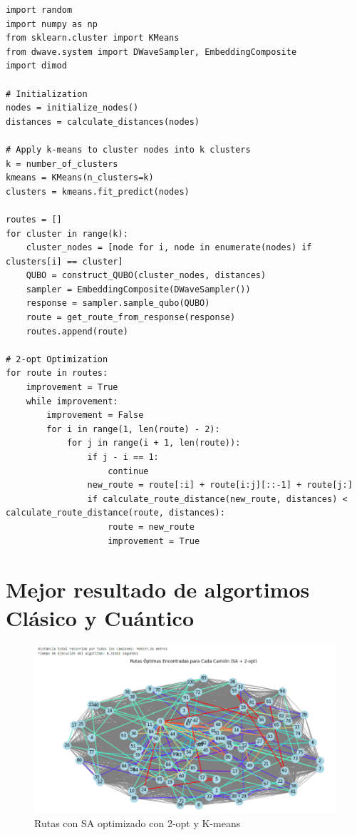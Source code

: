 \documentclass[11pt,a4paper,spanish]{book}
\begin{document}
\begin{lstlisting}
import random
import numpy as np
from sklearn.cluster import KMeans
from dwave.system import DWaveSampler, EmbeddingComposite
import dimod

# Initialization
nodes = initialize_nodes()
distances = calculate_distances(nodes)

# Apply k-means to cluster nodes into k clusters
k = number_of_clusters
kmeans = KMeans(n_clusters=k)
clusters = kmeans.fit_predict(nodes)

routes = []
for cluster in range(k):
    cluster_nodes = [node for i, node in enumerate(nodes) if clusters[i] == cluster]
    QUBO = construct_QUBO(cluster_nodes, distances)
    sampler = EmbeddingComposite(DWaveSampler())
    response = sampler.sample_qubo(QUBO)
    route = get_route_from_response(response)
    routes.append(route)

# 2-opt Optimization
for route in routes:
    improvement = True
    while improvement:
        improvement = False
        for i in range(1, len(route) - 2):
            for j in range(i + 1, len(route)):
                if j - i == 1:
                    continue
                new_route = route[:i] + route[i:j][::-1] + route[j:]
                if calculate_route_distance(new_route, distances) < calculate_route_distance(route, distances):
                    route = new_route
                    improvement = True
\end{lstlisting}


\section{Mejor resultado de algortimos Clásico y Cuántico}

\begin{figure}[h!]
    \centering
    \includegraphics[width=1\linewidth]{solucionSA2opt.png}
    \caption{Rutas con SA optimizado con 2-opt y K-means}
    \label{fig:enter-label}
\end{figure}
\end{document}
